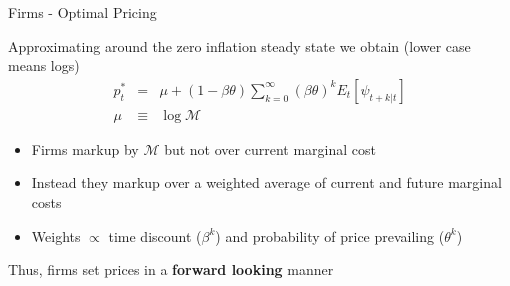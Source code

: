 \documentclass{beamer}
\begin{document}
%
%	
%
%
%
%


	
\begin{frame}{Firms - Optimal Pricing}

Approximating around the zero inflation steady state we obtain (lower case means logs)
\begin{eqnarray}
p_{t}^{\ast} &=& 	\mu + (1-\beta \theta) \sum\limits_{k=0}^{\infty} (\beta \theta)^{k} E_{t}\left[ \psi_{t+k|t} \right] \\
\mu 		&\equiv& \log{\mathcal{M}} \nonumber
\end{eqnarray}

\begin{itemize}
\item	Firms markup by $\mathcal{M}$ but not over current marginal cost
\item	Instead they markup over a weighted average of current and future marginal costs
\item	Weights $\propto$ time discount ($\beta^{k}$) and probability of price prevailing ($\theta^{k}$)
\end{itemize}

\vspace{2mm}
Thus, firms set prices in a \textbf{forward looking} manner

\end{frame}
\end{document}
